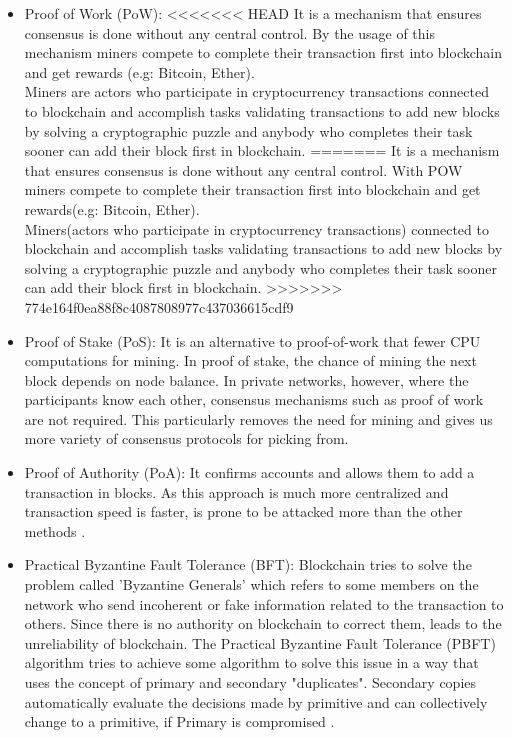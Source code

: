 \begin{itemize}
    \item Proof of Work (PoW): 
<<<<<<< HEAD
    It is a mechanism that ensures consensus is done without any central control. By the usage of this mechanism miners compete to complete their transaction first into blockchain and get rewards (e.g: Bitcoin, Ether).\\
    Miners are actors who participate in cryptocurrency transactions connected to blockchain and accomplish tasks validating transactions to add new blocks by solving a cryptographic puzzle and anybody who completes their task sooner can add their block first in blockchain\cite{Pablo}.
=======
    It is a mechanism that ensures consensus is done without any central control. With POW miners compete to complete their transaction first into blockchain and get rewards(e.g: Bitcoin, Ether).\\
    Miners(actors who participate in cryptocurrency transactions) connected to blockchain and accomplish tasks validating transactions to add new blocks by solving a cryptographic puzzle and anybody who completes their task sooner can add their block first in blockchain\cite{Pablo}.
>>>>>>> 774e164f0ea88f8c4087808977c437036615cdf9
    \item Proof of Stake (PoS): 
    It is an alternative to proof-of-work that fewer CPU computations for mining. In proof of stake, the chance of mining the next block depends on node balance. 
    In private networks, however, where the participants know each other, consensus mechanisms such as proof of work are not required. This particularly removes the need for mining and gives us more variety of consensus protocols for picking from\cite{Christidis}.
    \item Proof of Authority (PoA): It confirms accounts and allows them to add a transaction in blocks. As this approach is much more centralized and transaction speed is faster, is prone to be attacked more than the other methods \cite{Luke}.
    \item Practical Byzantine Fault Tolerance (BFT): Blockchain tries to solve the problem called 'Byzantine Generals' which refers to some members on the network who send incoherent or fake information related to the transaction to others. Since there is no authority on blockchain to correct them, leads to the unreliability of blockchain. The Practical Byzantine Fault Tolerance (PBFT) algorithm tries to achieve some algorithm to solve this issue in a way that uses the concept of primary and secondary "duplicates". Secondary copies automatically evaluate the decisions made by primitive and can collectively change to a primitive, if Primary is compromised \cite{Luke}.
\end{itemize}
